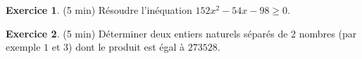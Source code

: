 \documentclass{exam}
\theoremstyle{definition}
\newtheorem{exercice}{Exercice}
\begin{document}
\large


% 
% 


\begin{exercice}{(5 min)}
    Résoudre l'inéquation $152x^2 -54x - 98 \geq 0$.%
\end{exercice}

\begin{exercice}{(5 min)}
    Déterminer deux entiers naturels séparés de 2 nombres (par exemple $1$ et $3$) dont le produit est égal à $273528$.
\end{exercice}

\end{document}
